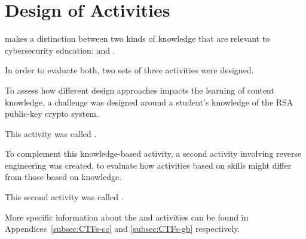 











\providecommand{\heading}[1]{\section{#1}}



\providecommand{\subheading}[1]{\subsection{#1}}







\heading{Design of Activities}



    \textcite{R-Weiss} makes a distinction between two kinds of knowledge that are relevant to cybersecurity education:  and . %



In order to evaluate both, two sets of three activities were designed. %



To assess how different design approaches impacts the learning of content knowledge, a challenge was designed around a student's  knowledge of the RSA public-key crypto system. %



This activity was called . %



To complement this knowledge-based activity, a second activity involving reverse engineering was created, to evaluate how activities based on skills might differ from those based on knowledge. %



This second activity was called . %



More specific information about the  and  activities can be found in Appendices~\ref{subsec:CTFs-cc} and \ref{subsec:CTFs-gb} respectively.







